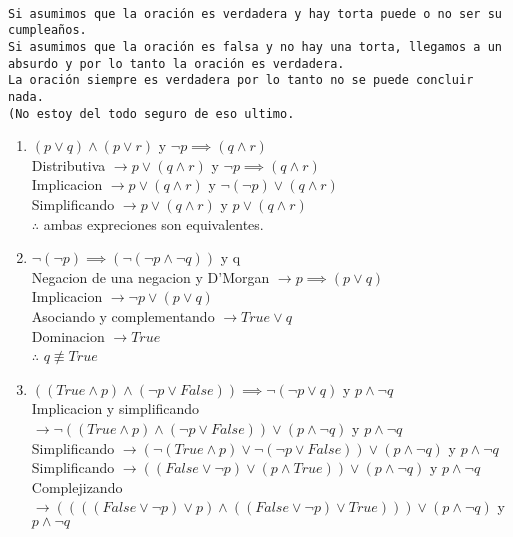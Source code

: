 \documentclass[10pt,a4paper,2in]{article}
\begin{document}
\texttt{\\Si asumimos que la oración es verdadera y hay torta puede o no ser su cumpleaños.\\
Si asumimos que la oración es falsa y no hay una torta, llegamos a un absurdo y por lo tanto la oración es verdadera.\\
La oración siempre es verdadera por lo tanto no se puede concluir nada.\\
(No estoy del todo seguro de eso ultimo.}
\begin{enumerate}[label=\alph*]
\item $(p\lor q)\land (p \lor r)$ y $\lnot p \implies (q\land r)$
\\Distributiva $\rightarrow p\lor (q\land r)$ y $\lnot p \implies (q\land r)$
\\Implicacion $\rightarrow p\lor (q\land r)$ y $\lnot(\lnot p) \lor (q\land r)$
\\Simplificando $\rightarrow p\lor (q\land r)$ y $p \lor (q\land r)$
\\$\therefore$ ambas expreciones son equivalentes.
\item $\lnot(\lnot p)\implies (\lnot(\lnot p\land \lnot q))$ y q
\\Negacion de una negacion y D'Morgan $\rightarrow p \implies  (p \lor q)$
\\Implicacion $\rightarrow \lnot p \lor ( p\lor q)$
\\Asociando y complementando $\rightarrow True \lor q$
\\Dominacion $\rightarrow True$
\\$\therefore$ $q\not\equiv True$
\item $((True\land p)\land(\lnot p \lor False))\implies \lnot(\lnot p \lor q)$ y $p\land \lnot q$
\\Implicacion y simplificando $\rightarrow \lnot((True\land p)\land(\lnot p \lor False))\lor (p \land \lnot q)$ y $p\land \lnot q$
\\Simplificando $\rightarrow (\lnot(True\land p)\lor \lnot(\lnot p \lor False))\lor (p \land \lnot q)$ y $p\land \lnot q$
\\Simplificando $\rightarrow ((False\lor \lnot p)\lor (p \land True))\lor (p \land \lnot q)$ y $p\land \lnot q$
\\Complejizando $\rightarrow ((((False\lor \lnot p) \lor p) \land ((False\lor \lnot p) \lor True)))\lor (p \land \lnot q)$ y $p\land \lnot q$

\end{enumerate}
\end{document}
